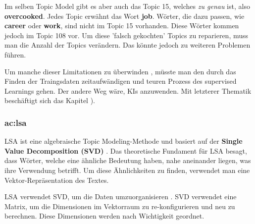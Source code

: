 Im selben Topic Model gibt es aber auch das Topic 15, welches \textit{zu genau} ist, also \textbf{overcooked}. Jedes Topic erwähnt das Wort \textbf{job}. Wörter, die dazu passen, wie \textbf{career} oder \textbf{work}, sind nicht im Topic 15 vorhanden. Diese Wörter kommen jedoch im Topic 108 vor. Um diese 'falsch gekochten' Topics zu reparieren, muss man die Anzahl der Topics verändern. Das könnte jedoch zu weiteren Problemen führen.

Um manche dieser Limitationen zu überwinden \cite{sense-topic-modelling-van-kessel}, müsste man den durch das Finden der Traingsdaten zeitaufwändigen und teuren Prozess des supervised Learnings gehen. Der andere Weg wäre, KIs anzuwenden. Mit letzterer Thematik beschäftigt sich das Kapitel ).

\subsubsection{\acrfull{ac:lsa}}

LSA ist eine algebraische Topic Modeling-Methode und basiert auf der \textbf{Single Value Decomposition (SVD)} \cite[4]{Kherwa2020}. Das theoretische Fundament für LSA besagt, dass Wörter, welche eine ähnliche Bedeutung haben, nahe aneinander liegen, was ihre Verwendung betrifft. Um diese Ähnlichkeiten zu finden, verwendet man eine Vektor-Repräsentation des Textes.

LSA verwendet SVD, um die Daten umzuorganisieren \cite[174]{topicmodelsurvey_padmaja}. SVD verwendet eine Matrix, um die Dimensionen im Vektorraum zu re-konfigurieren und neu zu berechnen. Diese Dimensionen werden nach Wichtigkeit geordnet.


